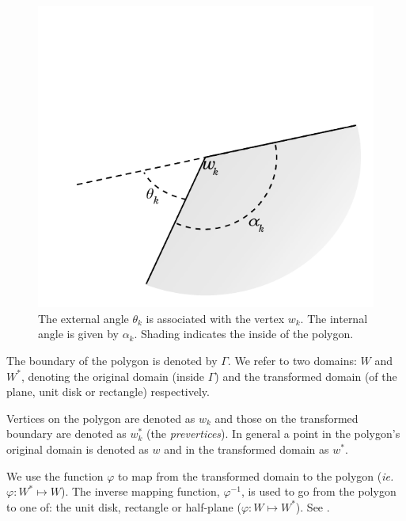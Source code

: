 \begin{figure} [bp]
\centering
\includegraphics[scale=0.6]{sc/figs/anglediagram.pdf}
\caption{The external angle $\theta_k$ is associated with the vertex $w_k$. The internal angle is given by $\alpha_k$. Shading indicates the inside of the polygon.}
\label{anglediagram}
\end{figure}

The boundary of the polygon is denoted by $\Gamma$. We refer to two domains: $W$ and $W^*$, denoting the original domain (inside $\Gamma$) and the transformed domain (of the plane, unit disk or rectangle) respectively. 

Vertices on the polygon are denoted as $w_k$ and those on the transformed boundary are denoted as $w^*_k$ (the \emph{prevertices}). In general a point in the polygon's original domain is denoted as $w$ and in the transformed domain as $w^*$.

We use the function $\varphi$ to map from the transformed domain to the polygon (\emph{ie.} $\varphi:W^* \mapsto W$). The inverse mapping function, $\varphi^{-1}$, is used to go from the polygon to one of: the unit disk, rectangle or half-plane ($\varphi:W \mapsto W^*$).  See .

